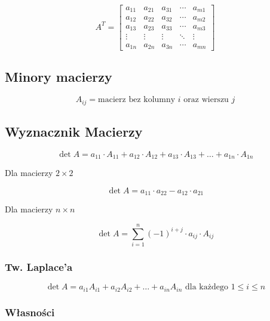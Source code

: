 \documentclass{../notatki}
\begin{document}
$$
A^T =
\begin{bmatrix}
    a_{11} & a_{21} & a_{31} & \cdots & a_{m1} \\
    a_{12} & a_{22} & a_{32} & \cdots & a_{m2} \\
    a_{13} & a_{23} & a_{33} & \cdots & a_{m3} \\
    \vdots & \vdots & \vdots & \ddots & \vdots \\
    a_{1n} & a_{2n} & a_{3n} & \cdots & a_{mn}
\end{bmatrix}
$$

\subsection{Minory macierzy}

$$
A_{ij} = \text{macierz bez kolumny } i \text{ oraz wierszu } j
$$

\subsection{Wyznacznik Macierzy}

$$
\det A = a_{11} \cdot A_{11} + a_{12} \cdot A_{12} + a_{13} \cdot A_{13} + \dots + a_{1n} \cdot A_{1n}
$$

Dla macierzy $2 \times 2$

$$
\det A = a_{11} \cdot a_{22} - a_{12} \cdot a_{21}
$$

Dla macierzy $n \times n$

$$
\det A = \sum_{i=1}^{n} (-1)^{i+j} \cdot a_{ij} \cdot A_{ij}
$$

\subsubsection{Tw. Laplace'a}

$$
\det A = a_{i1}A_{i1} + a_{i2}A_{i2} + \dots + a_{in}A_{in} \text{ dla każdego } 1 \le i \le n
$$

\subsubsection{Własności}
\end{document}
